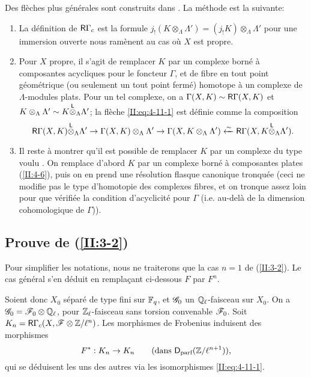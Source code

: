 \documentclass[oneside]{book}
\begin{document}
Des fl\`eches plus g\'en\'erales sont construits dans \cite[XVII 4.2.12]{4}. La 
m\'
ethode est la suivante: 
\begin{enumerate}[\indent a)]
  \item La d\'efinition de $\mathsf{R}\Gamma_c$ est la formule 
    $j_!(K\otimes_\Lambda\Lambda') = (j_! K)\otimes_\Lambda\Lambda'$ pour une 
    immersion ouverte nous ram\`enent au cas o\`u $X$ est propre. 
  \item Pour $X$ propre, il s'agit de remplacer $K$ par un complexe born\'e \`a 
    composantes acycliques pour le foncteur $\Gamma$, et de fibre en tout point 
    g\'eom\'etrique (ou seulement un tout point ferm\'e) homotope \`a un 
    complexe de $\Lambda$-modules plats. Pour un tel complexe, on a 
    $\Gamma(X,K)\sim \mathsf{R}\Gamma(X,K)$ et 
    $K\otimes_\Lambda\Lambda'\sim K{\overset{\mathsf{L}}{\otimes}}_\Lambda\Lambda'$; la fl\`eche 
    \eqref{II:eq:4-11-1} est d\'efinie comme la composition 
    \[
      \mathsf{R}\Gamma(X,K){\overset{\mathsf{L}}{\otimes}}_\Lambda \Lambda' \to \Gamma(X,K)\otimes_\Lambda\Lambda' \to \Gamma(X,K\otimes_\Lambda\Lambda') \xleftarrow\sim \mathsf{R}\Gamma(X,K{\overset{\mathsf{L}}{\otimes}}_\Lambda\Lambda') \text{.}
    \]
  \item Il reste \`a montrer qu'il est possible de remplacer $K$ par un 
    complexe du type voulu \cite[XVII.4.2.10]{4}. On remplace d'abord $K$ par 
    un complexe born\'e \`a composantes plates (\ref{II:4-6}), puis on en prend 
    une r\'esolution flasque canonique tronqu\'ee (ceci ne modifie pas le type 
    d'homotopie des complexes fibres, et on tronque assez loin pour que 
    v\'erifi\'ee la condition d'acyclicit\'e pour $\Gamma$ (i.e. au-del\`a 
    de la dimension cohomologique de $\Gamma$)). 
\end{enumerate}





\subsection{Prouve de \texorpdfstring{(\ref{II:3-2})}{(3.2)}}\label{II:4-13}

Pour simplifier les notations, nous ne traiterons que la cas $n=1$ de 
(\ref{II:3-2}). Le cas g\'en\'eral s'en d\'eduit en remplaçant ci-dessous 
$F$ par $F^n$. 

Soient donc $X_0$ s\'epar\'e de type fini sur $\mathbb{F}_q$, et $\mathscr{G}_0$ un 
$\mathbb{Q}_\ell$-faisceau sur $X_0$. On a $\mathscr{G}_0=\mathscr{F}_0\otimes\mathbb{Q}_\ell$, pour 
$\mathbb{Z}_\ell$-faisceau sans torsion convenable $\mathscr{F}_0$. Soit 
$K_n=\mathsf{R}\Gamma_c(X,\mathscr{F}\otimes\mathbb{Z}/\ell^n)$. Les morphismes de Frobenius induisent 
des morphismes 
\[
  F^* : K_n\to K_n \qquad \text{(dans $\mathsf{D}_\text{parf}(\mathbb{Z}/\ell^{n+1})$),}
\]
qui se d\'eduisent les uns des autres via les isomorphismes 
\eqref{II:eq:4-11-1}. 
\end{document}
